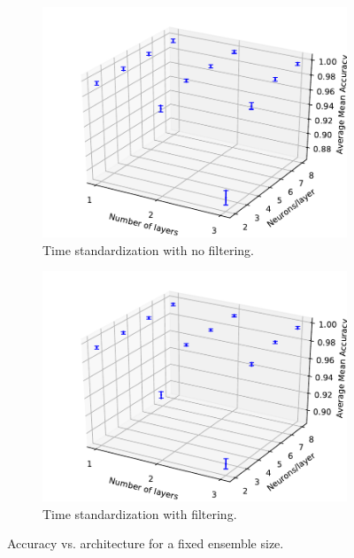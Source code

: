 \documentclass[paper=a4, fontsize=11pt]{scrartcl} %
\begin{document}
\begin{figure}[H]
\begin{subfigure}{0.5\linewidth}
			\centering
			\includegraphics[width=\linewidth]{../output/EN/figures/en_architecture_time_standard_941_486_N10.pdf}
			\caption{Time standardization with no filtering.}
		\end{subfigure}
		\begin{subfigure}{0.5\linewidth}
			\centering
			\includegraphics[width=\linewidth]{../output/EN/figures/en_architecture_time_standard_941_486_feature_pearson_90_N10.pdf}
			\caption{Time standardization with filtering.}
		\end{subfigure}
         \caption{Accuracy vs. architecture for a fixed ensemble size.}
         \label{fig:en_architecture_global}                     
\end{figure}
\end{document}

